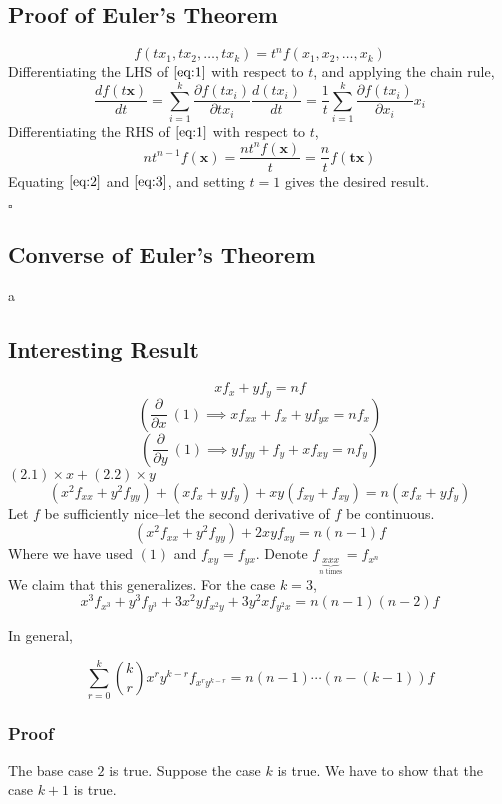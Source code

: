 \documentclass[11pt,a4paper]{article}
\begin{document}
\subsection{Proof of Euler's Theorem}
\[f(tx_1, tx_2, \dots, tx_k) = t^n f(x_1, x_2, \dots, x_k)\label{eq:1} \tag{1}\]
Differentiating the LHS of $\eqref{eq:1}$ with respect to $t$, and applying the chain rule,\[\frac{df(t\mathbf{x})}{dt} = \sum_{i=1}^k\frac{\partial f(tx_i)}{\partial tx_i} \frac{d(tx_i)}{dt} = \frac1t \sum_{i=1}^k\frac{\partial f(tx_i)}{\partial x_i} x_i \label{eq:2} \tag{2}\]Differentiating the RHS of $\eqref{eq:1}$ with respect to $t$, \[nt^{n-1} f(\mathbf{x}) = \frac{n t^n f(\mathbf{x})}{t} = \frac{n}{t} f(\mathbf{tx}) \label{eq:3} \tag{3}\]Equating $\eqref{eq:2}$ and $\eqref{eq:3}$, and setting $t = 1$ gives the desired result. \begin{flushright}$\square$\end{flushright}

\subsection{Converse of Euler's Theorem}
a
\subsection{Interesting Result}
\[xf_x + yf_y = nf \label{eq:a} \tag{1}\]
\[ \left(\frac{\partial}{\partial x} \ (1) \implies x f_{xx} + f_x + yf_{yx} = n f_x \right) \label{eq:b} \tag{2.1}\]
\[\left(\frac{\partial}{\partial y} \ (1) \implies y f_{yy} + f_y + x f_{xy} = n f_y \right)\label{eq:c} \tag{2.2}\]
$(2.1) \times x + (2.2) \times y$
\[(x^2 f_{xx}+y^2 f_{yy}) + (xf_x + yf_y) + xy (f_{xy} + f_{xy}) = n (xf_x + yf_y) \]
Let $f$ be sufficiently nice--let the second derivative of $f$ be continuous. 
\[(x^2 f_{xx}+y^2 f_{yy}) + 2xyf_{xy} = n(n-1)f \]
Where we have used $(1)$ and $f_{xy} = f_{yx}$.
Denote $f_{\underbrace{xxx}_\text{$n$ times}} = f_{x^n}$\\
We claim that this generalizes. For the case ${k=3}$,
\[x^3 f_{x^3} + y^3 f_{y^3} + 3x^2 y f_{x^2y} + 3y^2x f_{y^2x} = n(n-1)(n-2)f\]

In general,

\[ \sum_{r=0}^k \binom{k}{r} x^r y^{k-r} f_{x^r y^{k-r}} = n(n-1)\dotsm(n-(k-1))f \]

\subsubsection*{Proof}
The base case $2$ is true. Suppose the case $k$ is true. We have to show that the case $k+1$ is true.
\end{document}
